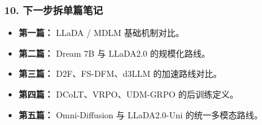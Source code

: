 \subsubsection{10. 下一步拆单篇笔记}

\begin{itemize}[leftmargin=1.5em]
  \item \textbf{第一篇：} LLaDA / MDLM 基础机制对比。
  \item \textbf{第二篇：} Dream 7B 与 LLaDA2.0 的规模化路线。
  \item \textbf{第三篇：} D2F、FS-DFM、d3LLM 的加速路线对比。
  \item \textbf{第四篇：} DCoLT、VRPO、UDM-GRPO 的后训练定义。
  \item \textbf{第五篇：} Omni-Diffusion 与 LLaDA2.0-Uni 的统一多模态路线。
\end{itemize}
